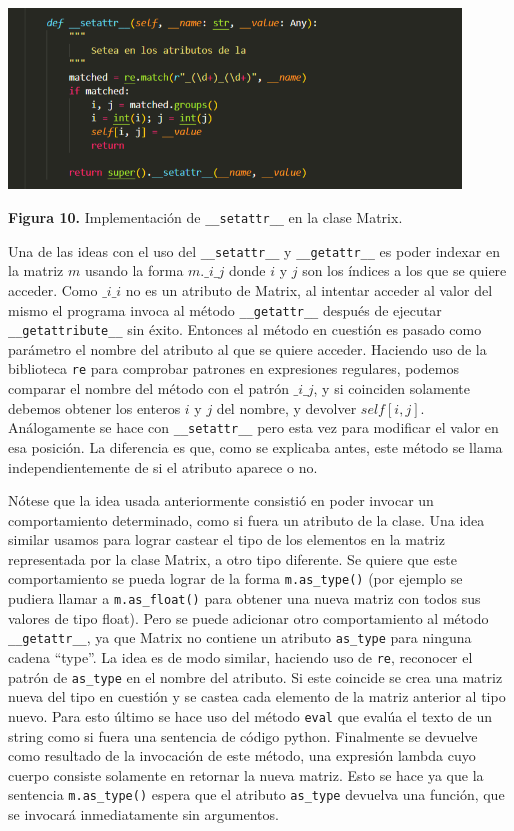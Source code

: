 \documentclass[10pt]{article} %
\newcommand{\csl}[1]{\colorbox{backcolour}{\texttt{#1}}}
\newcommand{\imgcaption}[2]{\tiny \textbf{Figura #1.} #2.}
\newcommand{\mgc}[2][]{\colorbox{backcolour}{\texttt{\_\_#2\_\_#1}}}
\newcommand{\mgccapt}[1]{\texttt{\_\_#1\_\_}}
\begin{document}
\begin{center}
	\includegraphics[width=12cm]{setattr.png}
	
	\imgcaption{10}{Implementaci\'on de \mgccapt{setattr} en la clase Matrix}
\end{center}

Una de las ideas con el uso del \mgc{setattr} y \mgc{getattr} es poder indexar en la matriz $m$ usando la forma \csl{$m.\_i\_j$} donde $i$ y $j$ son los \'indices a los que se quiere acceder. Como \csl{$\_i\_i$} no es un atributo de Matrix, al intentar acceder al valor del mismo el programa invoca al m\'etodo \mgc{getattr} despu\'es de ejecutar \mgc{getattribute} sin \'exito. Entonces al m\'etodo en cuesti\'on es pasado como par\'ametro el nombre del atributo al que se quiere acceder. Haciendo uso de la biblioteca \csl{re} para comprobar patrones en expresiones regulares, podemos comparar el nombre del m\'etodo con el patr\'on \csl{$\_i\_j$}, y si coinciden solamente debemos obtener los enteros $i$ y $j$ del nombre, y devolver \csl{$self[i, j]$}. An\'alogamente se hace con \mgc{setattr} pero esta vez para modificar el valor en esa posici\'on. La diferencia es que, como se explicaba antes, este m\'etodo se llama independientemente de si el atributo aparece o no.

N\'otese que la idea usada anteriormente consisti\'o en poder invocar un comportamiento determinado, como si fuera un atributo de la clase. Una idea similar usamos para lograr castear el tipo de los elementos en la matriz representada por la clase Matrix, a otro tipo diferente. Se quiere que este comportamiento se pueda lograr de la forma \csl{m.as\_type()} (por ejemplo se pudiera llamar a \csl{m.as\_float()} para obtener una nueva matriz con todos sus valores de tipo float). Pero se puede adicionar otro comportamiento al m\'etodo \mgc{getattr}, ya que Matrix no contiene un atributo \csl{as\_type} para ninguna cadena ``type''. La idea es de modo similar, haciendo uso de \csl{re}, reconocer el patr\'on de \csl{as\_type} en el nombre del atributo. Si este coincide se crea una matriz nueva del tipo en cuesti\'on y se castea cada elemento de la matriz anterior al tipo nuevo. Para esto \'ultimo se hace uso del m\'etodo \csl{eval} que eval\'ua el texto de un string como si fuera una sentencia de c\'odigo python. Finalmente se devuelve como resultado de la invocaci\'on de este m\'etodo, una expresi\'on lambda cuyo cuerpo consiste solamente en retornar la nueva matriz. Esto se hace ya que la sentencia \csl{m.as\_type()} espera que el atributo \csl{as\_type} devuelva una funci\'on, que se invocar\'a inmediatamente sin argumentos.
\end{document}
